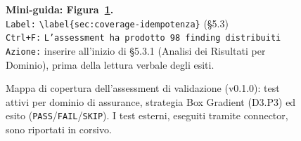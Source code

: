 \begin{figure}[ht]
{
  }%
  \caption{Mappa di copertura dell'assessment di validazione (v0.1.0): test attivi per dominio di assurance, strategia Box Gradient (D3.P3) ed esito (\texttt{PASS}/\texttt{FAIL}/\texttt{SKIP}). I test esterni, eseguiti tramite connector, sono riportati in corsivo.}
  \label{fig:coverage-map}
  \par\smallskip
  {\small \noindent\textbf{Mini-guida: Figura~\ref{fig:coverage-map}.}\\
    \texttt{Label:} \verb|\label{sec:coverage-idempotenza}| (\S5.3)\\
    \texttt{Ctrl+F:} \texttt{L'assessment ha prodotto 98 finding distribuiti}\\
    \texttt{Azione:} inserire all'inizio di \S5.3.1 (Analisi dei Risultati per Dominio), prima della lettura verbale degli esiti.}
\end{figure}


